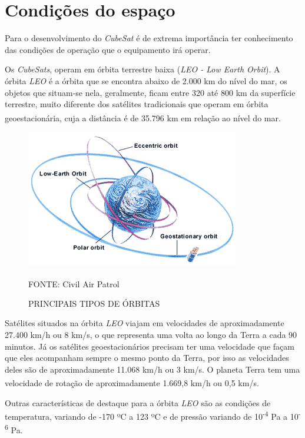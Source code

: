 \documentclass[
	12pt,				%
	openright,			%
	oneside,			%
	a4paper,			%
	english,			%
	french,				%
	spanish,			%
	brazil,				%
	oldfontcommands
	]{abntex2}
\begin{document}
\section[Condições do espaço]{Condições do espaço}
	
	Para o desenvolvimento do \textit{CubeSat} é de extrema importância ter conhecimento das condições de operação que o equipamento irá operar.
	
	Os \textit{CubeSats}, operam em órbita terrestre baixa (\textit{LEO - Low Earth Orbit}). A órbita \textit{LEO} é a órbita que se encontra abaixo de 2.000 km do nível do mar, os objetos que situam-se nela, geralmente, ficam entre 320 até 800 km da superfície terrestre, muito diferente dos satélites tradicionais que operam em órbita geoestacionária, cuja a distância é de 35.796 km em relação ao nível do mar.\textsuperscript{\cite{LEO}}\textsuperscript{\cite{GEO}}
	
	\begin{figure}[th]
		\caption{PRINCIPAIS TIPOS DE ÓRBITAS}
		\label{Fig_Orbitas}
		\centering
		\includegraphics[width=0.65\linewidth]{./figs/cubesat_03}
			
		\begin{small}
			FONTE: Civil Air Patrol\textsuperscript{\cite{CAP}}
		\end{small}		
	\end{figure}
	
	Satélites situados na órbita \textit{LEO} viajam em velocidades de aproximadamente 27.400 km/h ou 8 km/s, o que representa uma volta ao longo da Terra a cada 90 minutos. Já os satélites geoestacionários precisam ter uma velocidade que façam que eles acompanham sempre o mesmo ponto da Terra, por isso as velocidades deles são de aproximadamente 11.068 km/h ou 3 km/s. O planeta Terra tem uma velocidade de rotação de aproximadamente 1.669,8 km/h ou 0,5 km/s.\textsuperscript{\cite{LEO}}\textsuperscript{\cite{GEO}}
	
	 Outras características de destaque para a órbita \textit{LEO} são as condições de temperatura, variando de -170 ºC a 123 ºC e de pressão variando de 10\textsuperscript{-4} Pa a 10\textsuperscript{-6} Pa.\textsuperscript{\cite{LEO}}
	
\end{document}
